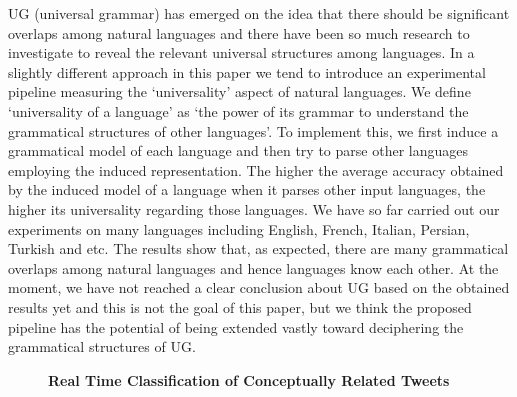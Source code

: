 \documentclass[10pt, a4paper, twopage, headinclude, footinclude, BCOR5mm]{scrartcl}
\begin{document}
\noindent
UG (universal grammar) has emerged on the idea that there should be significant overlaps among natural languages and there have been so much research to investigate to reveal the relevant universal structures among languages. In a slightly different approach in this paper we tend to introduce an experimental pipeline measuring the ‘universality’ aspect of natural languages. We define ‘universality of a language’ as ‘the power of its grammar to understand the grammatical structures of other languages’. To implement this, we first induce a grammatical model of each language and then try to parse other languages employing the induced representation. The higher the average accuracy obtained by the induced model of a language when it parses other input languages, the higher its universality regarding those languages. We have so far carried out our experiments on many languages including English, French, Italian, Persian, Turkish and etc. The results show that, as expected, there are many grammatical overlaps among natural languages and hence languages know each other. At the moment, we have not reached a clear conclusion about UG based on the obtained results yet and this is not the goal of this paper, but we think the proposed pipeline has the potential of being extended vastly toward deciphering the grammatical structures of UG. 


\newpage

\begin{figure}[t!]
\centering
\large\textbf{Real Time Classification of Conceptually Related Tweets}
\vspace*{0.5cm}
\end{figure}


        \begin{table}[t!]
    \end{table}
\end{document}
